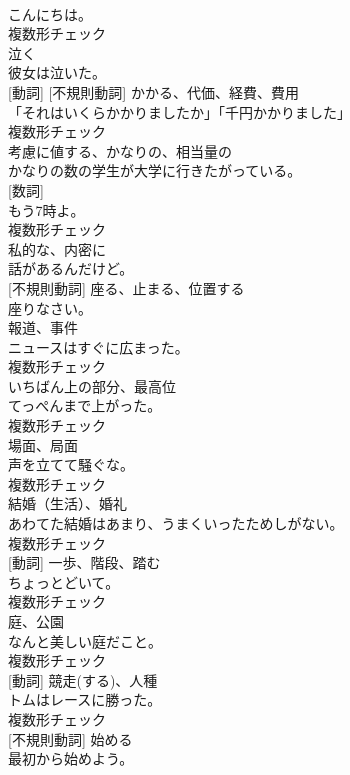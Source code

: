 \documentclass[8pt]{extreport}
\begin{document}
\begin{CJK}{UTF8}{min}
\\	こんにちは。	
\\	複数形チェック
\\	[動詞]	泣く	
\\	彼女は泣いた。	
\\	[名詞] [動詞] [不規則動詞]	かかる、代価、経費、費用	
\\	「それはいくらかかりましたか」「千円かかりました」	
\\	複数形チェック
\\	[形容詞]	考慮に値する、かなりの、相当量の	
\\	かなりの数の学生が大学に行きたがっている。	
\\	[名詞] [数詞]	
\\	もう7時よ。	
\\	複数形チェック
\\	[形容詞]	私的な、内密に	
\\	話があるんだけど。	
\\	[動詞] [不規則動詞]	座る、止まる、位置する	
\\	座りなさい。	
\\	[名詞]	報道、事件	
\\	ニュースはすぐに広まった。	
\\	複数形チェック
\\	[名詞]	いちばん上の部分、最高位	
\\	てっぺんまで上がった。	
\\	複数形チェック
\\	[名詞]	場面、局面	
\\	声を立てて騒ぐな。	
\\	複数形チェック
\\	[名詞]	結婚（生活）、婚礼	
\\	あわてた結婚はあまり、うまくいったためしがない。	
\\	複数形チェック
\\	[名詞] [動詞]	一歩、階段、踏む	
\\	ちょっとどいて。	
\\	複数形チェック
\\	[名詞]	庭、公園	
\\	なんと美しい庭だこと。	
\\	複数形チェック
\\	[名詞] [動詞]	競走(する)、人種	
\\	トムはレースに勝った。	
\\	複数形チェック
\\	[動詞] [不規則動詞]	始める	
\\	最初から始めよう。	

\end{CJK}
\end{document}
